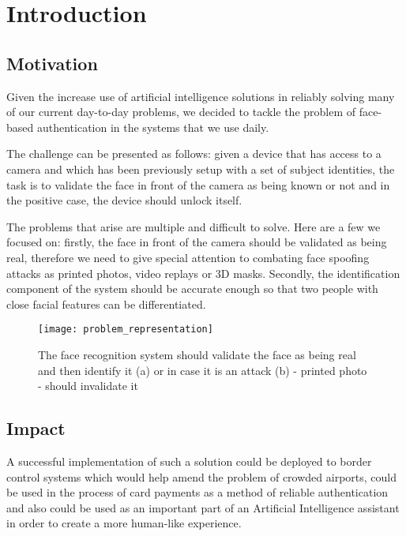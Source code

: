 \chapter{Introduction}

\section{Motivation}

Given the increase use of artificial intelligence solutions in reliably solving many of our current day-to-day problems, we decided to tackle the problem of face-based authentication in the systems that we use daily.

The challenge can be presented as follows: given a device that has access to a camera and which has been previously setup with a set of subject identities, the task is to validate the face in front of the camera as being known or not and in the positive case, the device should unlock itself.

The problems that arise are multiple and difficult to solve. Here are a few we focused on: firstly, the face in front of the camera should be validated as being real, therefore we need to give special attention to combating face spoofing attacks as printed photos, video replays or 3D masks. Secondly, the identification component of the system should be accurate enough so that two people with close facial features can be differentiated.

\begin{figure}[h]
	\begin{center}
		\texttt{[image: problem\_representation]}
		\caption[Desired behaviour of the face recognition system]{The face recognition system should validate the face as being real and then identify it (a) or in case it is an attack (b) - printed photo - should invalidate it}
	\end{center}
\end{figure}

\section{Impact}
A successful implementation of such a solution could be deployed to border control systems which would help amend the problem of crowded airports, could be used in the process of card payments as a method of reliable authentication and also could be used as an important part of an Artificial Intelligence assistant in order to create a more human-like experience.

